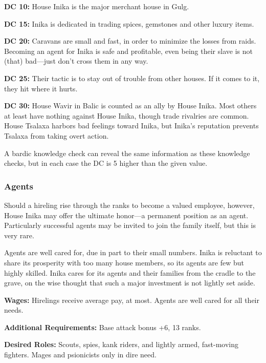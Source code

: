 \textbf{DC 10:} House Inika is the major merchant house in Gulg.

\textbf{DC 15:} Inika is dedicated in trading spices, gemstones and other luxury items.

\textbf{DC 20:} Caravans are small and fast, in order to minimize the losses from raids. Becoming an agent for Inika is safe and profitable, even being their slave is not (that) bad---just don't cross them in any way.

\textbf{DC 25:} Their tactic is to stay out of trouble from other houses.  If it comes to it, they hit where it hurts. 

\textbf{DC 30:} House Wavir in Balic is counted as an ally by House Inika. Most others at least have nothing against House Inika, though trade rivalries are common. House Tsalaxa harbors bad feelings toward Inika, but Inika's reputation prevents Tsalaxa from taking overt action.

A bardic knowledge check can reveal the same information as these knowledge checks, but in each case the DC is 5 higher than the given value.

\subsubsection{Agents}
Should a hireling rise through the ranks to become a valued employee, however, House Inika may offer the ultimate honor---a permanent position as an agent. Particularly successful agents may be invited to join the family itself, but this is very rare.

Agents are well cared for, due in part to their small numbers. Inika is reluctant to share its prosperity with too many house members, so its agents are few but highly skilled. Inika cares for its agents and their families from the cradle to the grave, on the wise thought that such a major investment is not lightly set aside.

\textbf{Wages:} Hirelings receive average pay, at most. Agents are well cared for all their needs.

\textbf{Additional Requirements:} Base attack bonus +6,  13 ranks.

\textbf{Desired Roles:} Scouts, spies, kank riders, and lightly armed, fast-moving fighters. Mages and psionicists only in dire need.